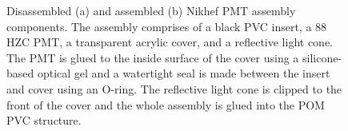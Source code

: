 \begin{figure} %
    \centering
    \quad
    \caption[Disassembled and assembled Nikhef PMT housing components.]
    {Disassembled (a) and assembled (b) Nikhef PMT assembly components. The assembly comprises of
        a black PVC insert, a \unit{88}{} HZC PMT, a transparent acrylic cover, and a
        reflective light cone. The PMT is glued to the inside surface of the cover using a
        silicone-based optical gel and a watertight seal is made between the insert and cover
        using an O-ring. The reflective light cone is clipped to the front of the cover and the
        whole assembly is glued into the POM PVC structure.}
    \label{fig:nikhef_pmt_assembly}
\end{figure}

